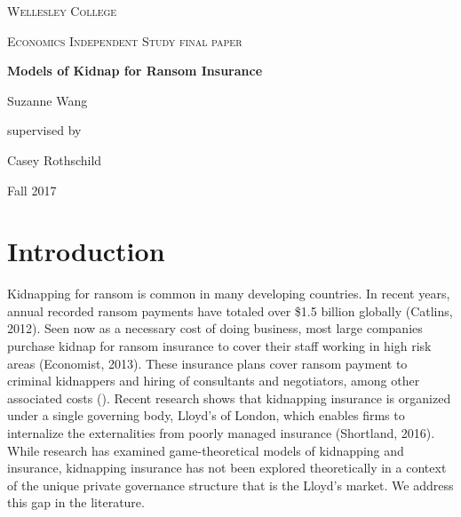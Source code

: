 \documentclass[12pt]{article}
\theoremstyle{plain}
\begin{document}
 

\begin{titlepage}
  \centering
  {\scshape\LARGE Wellesley College \par}
  \vspace{1cm}
  {\scshape\Large Economics Independent Study final paper\par}
  \vspace{3cm}
  {\huge\bfseries Models of Kidnap for Ransom Insurance\par}
  \vspace{2.5cm}
  {\Large Suzanne Wang\par}
  supervised by\par
    {\large Casey Rothschild\par}

  \vfill

  {\large Fall 2017\par}
\end{titlepage}

\section{Introduction}

Kidnapping for ransom is common in many developing countries. In recent years, annual recorded ransom payments have totaled over \$1.5 billion globally (Catlins, 2012). Seen now as a necessary cost of doing business, most large companies purchase kidnap for ransom insurance to cover their staff working in high risk areas (Economist, 2013). These insurance plans cover ransom payment to criminal kidnappers and hiring of consultants and negotiators, among other associated costs (). Recent research shows that kidnapping insurance is organized under a single governing body, Lloyd's of London, which enables firms to internalize the externalities from poorly managed insurance (Shortland, 2016). While research has examined game-theoretical models of kidnapping and insurance, kidnapping insurance has not been explored theoretically in a context of the unique private governance structure that is the Lloyd's market. We address this gap in the literature.
\end{document}
